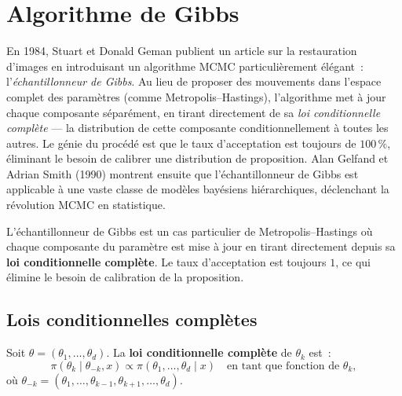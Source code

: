 \chapter{Algorithme de Gibbs}
\label{ch:gibbs}

En 1984, Stuart et Donald Geman publient un article sur la restauration d'images en introduisant un algorithme MCMC particuli\`erement \'el\'egant~: l'\emph{\'echantillonneur de Gibbs}. Au lieu de proposer des mouvements dans l'espace complet des param\`etres (comme Metropolis--Hastings), l'algorithme met \`a jour chaque composante s\'epar\'ement, en tirant directement de sa \emph{loi conditionnelle compl\`ete} --- la distribution de cette composante conditionnellement \`a toutes les autres. Le g\'enie du proc\'ed\'e est que le taux d'acceptation est toujours de $100\,\%$, \'eliminant le besoin de calibrer une distribution de proposition. Alan Gelfand et Adrian Smith (1990) montrent ensuite que l'\'echantillonneur de Gibbs est applicable \`a une vaste classe de mod\`eles bay\'esiens hi\'erarchiques, d\'eclenchant la r\'evolution MCMC en statistique.

\begin{intuition}[title=\textbf{Id\'ee centrale}]
L'\'echantillonneur de Gibbs est un cas particulier de
Metropolis--Hastings o\`u chaque composante du param\`etre est mise \`a
jour en tirant directement depuis sa \textbf{loi conditionnelle compl\`ete}.
Le taux d'acceptation est toujours $1$, ce qui \'elimine le besoin de
calibration de la proposition.
\end{intuition}

\section{Lois conditionnelles compl\`etes}

\begin{definition}
Soit $\theta = (\theta_1, \ldots, \theta_d)$. La \textbf{loi
conditionnelle compl\`ete} de $\theta_k$ est~:
\[
  \pi(\theta_k \mid \theta_{-k}, x)
  \propto \pi(\theta_1, \ldots, \theta_d \mid x)
  \quad \text{en tant que fonction de } \theta_k,
\]
o\`u $\theta_{-k} = (\theta_1, \ldots, \theta_{k-1}, \theta_{k+1}, \ldots, \theta_d)$.
\end{definition}

